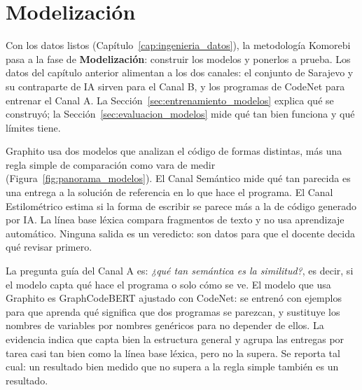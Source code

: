 \chapter{Modelización}
\label{cap:modelado}

Con los datos listos (Capítulo~\ref{cap:ingenieria_datos}), la metodología Komorebi \cite{verges_como_2023} pasa a la fase de \textbf{Modelización}: construir los modelos y ponerlos a prueba. Los datos del capítulo anterior alimentan a los dos canales: el conjunto de Sarajevo y su contraparte de IA sirven para el Canal B, y los programas de CodeNet para entrenar el Canal A. La Sección~\ref{sec:entrenamiento_modelos} explica qué se construyó; la Sección~\ref{sec:evaluacion_modelos} mide qué tan bien funciona y qué límites tiene.

Graphito usa dos modelos que analizan el código de formas distintas, más una regla simple de comparación como vara de medir (Figura~\ref{fig:panorama_modelos}). El Canal Semántico mide qué tan parecida es una entrega a la solución de referencia en lo que hace el programa. El Canal Estilométrico estima si la forma de escribir se parece más a la de código generado por IA. La línea base léxica compara fragmentos de texto y no usa aprendizaje automático. Ninguna salida es un veredicto: son datos para que el docente decida qué revisar primero.

La pregunta guía del Canal A es: \emph{¿qué tan semántica es la similitud?}, es decir, si el modelo capta qué hace el programa o solo cómo se ve. El modelo que usa Graphito es GraphCodeBERT ajustado con CodeNet: se entrenó con ejemplos para que aprenda qué significa que dos programas se parezcan, y sustituye los nombres de variables por nombres genéricos para no depender de ellos. La evidencia indica que capta bien la estructura general y agrupa las entregas por tarea casi tan bien como la línea base léxica, pero no la supera. Se reporta tal cual: un resultado bien medido que no supera a la regla simple también es un resultado.

